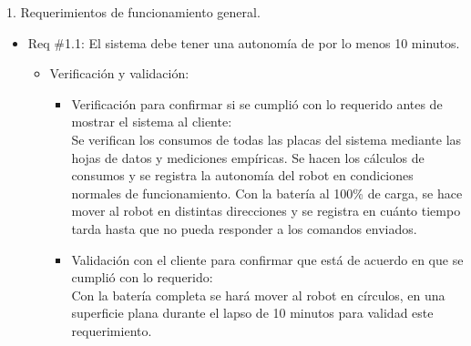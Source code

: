 \documentclass[11pt]{charter}
\begin{document}




1. Requerimientos de funcionamiento general.
\begin{itemize} 
\item Req \#1.1: El sistema debe tener una autonomía de por lo menos 10 minutos. 
\begin{itemize}
\item Verificación y validación:
	\begin{itemize}
	\item Verificación para confirmar si se cumplió con lo requerido 	antes de mostrar el sistema al cliente:\\
	Se verifican los consumos de todas las placas del sistema 				mediante las hojas de datos y mediciones empíricas. Se hacen los 	cálculos de consumos y se registra la autonomía del robot en 			condiciones normales de funcionamiento. Con la batería al 100\%
	 de carga, se hace mover al robot en distintas direcciones y se
	 registra en cuánto tiempo tarda hasta que no pueda responder a
	  los comandos enviados.
	\item Validación con el cliente para confirmar que está de 				acuerdo en que se cumplió con lo requerido:\\
	Con la batería completa se hará mover al robot en círculos, en 			una superficie plana durante el lapso de 10 minutos para validad 	este requerimiento.
	\end{itemize}
\end{itemize}	
\end{itemize}
\end{document}
